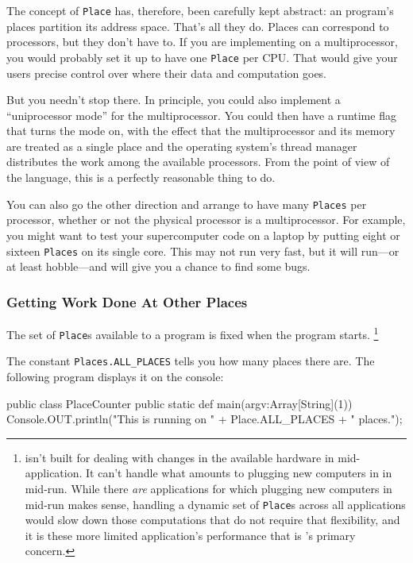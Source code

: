The concept of {\tt Place} has, therefore, been carefully kept abstract:
an \Xten{} program's places partition its address space.  That's all they do.
Places can correspond to processors, but they don't have to. If you are
implementing \Xten{} on a multiprocessor, you would probably
set it up to have one {\tt Place}
per CPU. That would give your users precise control over where their data and
computation goes.  

But you needn't stop there.
In principle, you could also implement a ``uniprocessor mode'' for the multiprocessor.
You could then have a runtime flag that turns the mode on, with the effect that
the multiprocessor
and its memory are treated as a single place and the operating system's
thread manager distributes the work among the available processors.
From the point of view of the \Xten{} language, this is a perfectly reasonable
thing to do.  

You can also go the other direction and 
arrange to have many {\tt Places} per processor, whether or not the
physical processor is a multiprocessor.  For example,
you might want to test your supercomputer code on a laptop by putting eight or
sixteen {\tt Places} on its single core.  This may not run very fast, but it will
run---or at least hobble---and will give you a chance to find some bugs.  


\subsubsection{Getting Work Done At Other Places}

The set of {\tt Place}s available to a program is fixed when the program starts.
\footnote{
\Xten{} isn't built for dealing with changes in the available hardware in 
mid-application.  It can't handle what
amounts to plugging new computers in in mid-run.  While there {\em are}
applications for which plugging new computers in mid-run makes sense,
handling a dynamic set of {\tt Place}s across all applications would slow
down those computations that do not require that flexibility, and it is these
more limited application's performance that is \Xten{}'s primary concern.
}

The constant {\tt Places.ALL\_PLACES} tells you how many places there are.
The following program displays it on the console:
\begin{xtennum}[]
public class PlaceCounter {
  public static def main(argv:Array[String](1)) {
     Console.OUT.println("This is running on " + 
        Place.ALL_PLACES + " places.");
  }
}

\end{xtennum}


